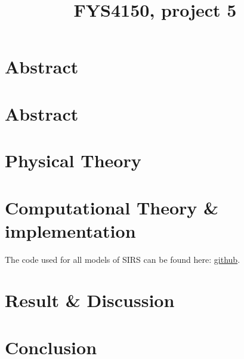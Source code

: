 
\usepackage{babel, csquotes, newcent, textcomp}
\usepackage[backend=biber, sortcites]{biblatex}


\title{FYS4150, project 5 }

	\mnfrontpage

\section{Abstract}

	
\pagestyle{fancy}
\fancyhf{}
\fancyfoot[CE,LO]{\leftmark}

\renewcommand{\headrulewidth}{2pt}
\renewcommand{\footrulewidth}{1pt}


	\tableofcontents

\section{Abstract}


\pagebreak


\pagebreak
\section{Physical Theory}


\section{Computational Theory \& implementation}\label{sec:comp-theory}
The code used for all models of SIRS can be found here: \href{https://github.com/sondrt/FYS4150/tree/master/project5}{github}.



%

\pagebreak
\section{Result \& Discussion}


\section{Conclusion}




